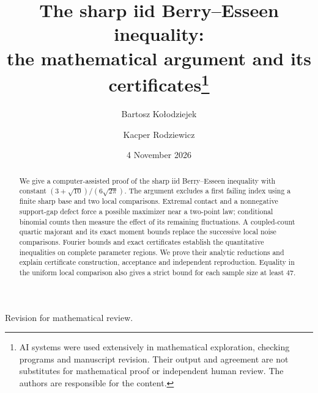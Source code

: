 \documentclass[11pt,a4paper]{article}
\title{The sharp iid Berry--Esseen inequality:\\
the mathematical argument and its certificates\thanks{AI systems were used
extensively in mathematical exploration, checking programs and manuscript
revision. Their output and agreement are not substitutes for mathematical
proof or independent human review. The authors are responsible for the content.}}
\author{Bartosz Ko{\l}odziejek \and Kacper Rodziewicz}
\date{4 November 2026}
\theoremstyle{definition}
\theoremstyle{remark}
\begin{document}
\maketitle
\begin{center}\small
Revision for mathematical review.
\end{center}
\begin{abstract}
We give a computer-assisted proof of the sharp iid Berry--Esseen
inequality with constant $(3+\sqrt{10})/(6\sqrt{2\pi})$.
The argument excludes a first failing index using a finite sharp base
and two local comparisons. Extremal contact and a nonnegative support-gap
defect force a possible maximizer near a two-point law; conditional
binomial counts then measure the effect of its remaining fluctuations.
A coupled-count quartic majorant and its exact moment bounds replace
the successive local noise comparisons.
Fourier bounds and exact certificates establish the quantitative
inequalities on complete parameter regions. We prove their analytic
reductions and explain certificate construction, acceptance and
independent reproduction. Equality in the uniform local comparison
also gives a strict bound for each sample size at least $47$.
\end{abstract}
\begingroup\small\tableofcontents\endgroup








\begingroup\small\raggedright
{}


\endgroup
\end{document}
